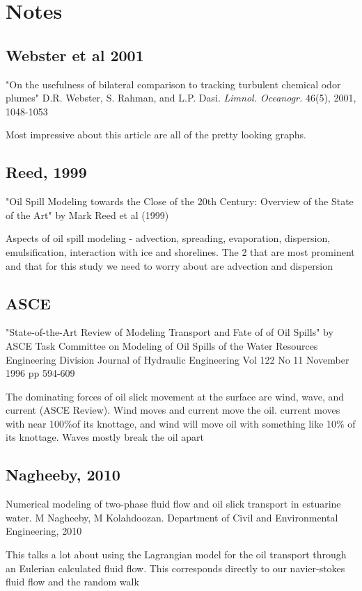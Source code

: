 \documentclass[11pt]{article} %
\begin{document}
\section{Notes}


\subsection{Webster et al 2001}
"On the usefulness of bilateral comparison to tracking turbulent chemical odor plumes"
D.R. Webster, S. Rahman, and L.P. Dasi.  \emph{Limnol. Oceanogr.} 46(5), 2001, 1048-1053

Most impressive about this article are all of the pretty looking graphs.  

\subsection{Reed, 1999}
	"Oil Spill Modeling towards the Close of the 20th Century: Overview of the State of the Art" by Mark Reed et al (1999)

	Aspects of oil spill modeling - advection, spreading, evaporation, dispersion, emulsification, interaction with ice and shorelines.  The 2 that are most prominent and that for this study we need to worry about are advection and dispersion

\subsection{ASCE}
"State-of-the-Art Review of Modeling Transport and Fate of of Oil Spills" by ASCE Task Committee on Modeling of Oil Spills of the Water Resources Engineering Division
Journal of Hydraulic Engineering Vol 122 No 11 November 1996 pp 594-609

The dominating forces of oil slick movement at the surface are wind, wave, and current (ASCE Review).   Wind moves and current move the oil.  current moves with near 100\%of its knottage, and wind will move oil with something like 10\% of its knottage.  Waves mostly break the oil apart



\subsection{Nagheeby, 2010}
Numerical modeling of two-phase fluid flow and oil slick transport in estuarine water. M Nagheeby, M Kolahdoozan.  Department of Civil and Environmental Engineering, 2010

This talks a lot about using the Lagrangian model for the oil transport through an Eulerian calculated fluid flow.  This corresponds directly to our navier-stokes fluid flow and the random walk
\end{document}
